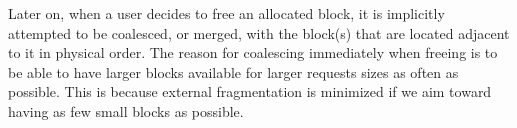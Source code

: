 Later on, when a user decides to free an allocated block, it is implicitly attempted to be coalesced, or merged, with the block(s) that are located adjacent to it in physical order. The reason for coalescing immediately when freeing is to be able to have larger blocks available for larger requests sizes as often as possible. This is because external fragmentation is minimized if we aim toward having as few small blocks as possible.

